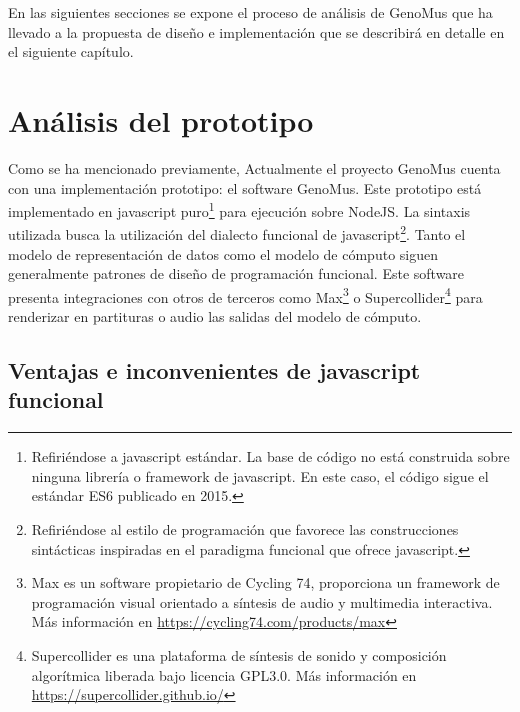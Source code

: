 En las siguientes secciones se expone el proceso de análisis de GenoMus que ha llevado a la propuesta de diseño e implementación que se describirá en detalle en el siguiente capítulo. 

\section{Análisis del prototipo}
 
Como se ha mencionado previamente, Actualmente el proyecto GenoMus cuenta con una implementación prototipo: el software GenoMus\cite{GenoMus}. Este prototipo está implementado en javascript puro\footnote{Refiriéndose a javascript estándar. La base de código no está construida sobre ninguna librería o framework de javascript. En este caso, el código sigue el estándar ES6\cite{es6} publicado en 2015.} para ejecución sobre NodeJS. La sintaxis utilizada busca la utilización del dialecto funcional de javascript\footnote{Refiriéndose al estilo de programación que favorece las construcciones sintácticas inspiradas en el paradigma funcional que ofrece javascript.}. Tanto el modelo de representación de datos como el modelo de cómputo siguen generalmente patrones de diseño de programación funcional. Este software presenta integraciones con otros de terceros como Max\footnote{Max es un software propietario de Cycling 74, proporciona un framework de programación visual orientado a síntesis de audio y multimedia interactiva. Más información en \url{https://cycling74.com/products/max}} o Supercollider\footnote{Supercollider es una plataforma de síntesis de sonido y composición algorítmica liberada bajo licencia GPL3.0. Más información en \url{https://supercollider.github.io/}} para renderizar en partituras o audio las salidas del modelo de cómputo.

\subsection{Ventajas e inconvenientes de javascript funcional}

